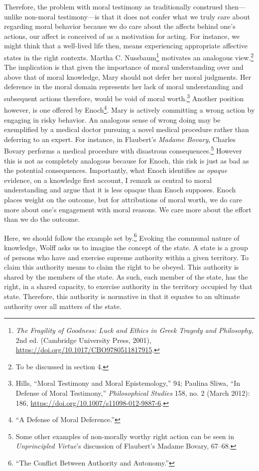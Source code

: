 \documentclass[phdthesis,12pt,final]{wuthesis}
\theoremstyle{definition}
\theoremstyle{definition}
\theoremstyle{definition}
\theoremstyle{definition}
\theoremstyle{remark}
\begin{document}
Therefore, the problem with moral testimony as traditionally construed then---unlike non-moral testimony---is that it does not confer what we truly care about regarding moral behavior because we do care about the affects behind one's actions, our affect is conceived of as a motivation for acting. For instance, we might think that a well-lived life then, means experiencing appropriate affective states in the right contexts. Martha C. Nussbaum\footnote{\emph{The {Fragility} of {Goodness}: {Luck} and {Ethics} in {Greek Tragedy} and {Philosophy}}, 2nd ed. (Cambridge University Press, 2001), \url{https://doi.org/10.1017/CBO9780511817915}.} motivates an analogous view.\footnote{To be discussed in section 4.} The implication is that given the importance of moral understanding over and above that of moral knowledge, Mary should not defer her moral judgments. Her deference in the moral domain represents her lack of moral understanding and subsequent actions therefore, would be void of moral worth.\footnote{Hills, {``Moral Testimony and Moral Epistemology,''} 94; Paulina Sliwa, {``In Defense of Moral Testimony,''} \emph{Philosophical Studies} 158, no. 2 (March 2012): 186, \url{https://doi.org/10.1007/s11098-012-9887-6}.} Another position however, is one offered by Enoch\footnote{{``A {Defense} of {Moral Deference}.''}}. Mary is actively committing a wrong action by engaging in risky behavior. An analogous sense of wrong doing may be exemplified by a medical doctor pursuing a novel medical procedure rather than deferring to an expert. For instance, in Flaubert's \emph{Madame Bovary}, Charles Bovary performs a medical procedure with disastrous consequences.\footnote{ Some other examples of non-morally worthy right action can be seen in \emph{Unprincipled {Virtue}}'s discussion of Flaubert's Madame Bovary, 67--68.} However this is not as completely analogous because for Enoch, this risk is just as bad as the potential consequences. Importantly, what Enoch identifies as \emph{opaque} evidence, on a knowledge first account, I remark as central to moral understanding and argue that it is less opaque than Enoch supposes. Enoch places weight on the outcome, but for attributions of moral worth, we do care more about one's engagement with moral reasons. We care more about the effort than we do the outcome.

Here, we should follow the example set by.\footnote{{``The {Conflict Between Authority} and {Autonomy}.''}} Evoking the communal nature of knowledge, Wolff asks us to imagine the concept of the state. A state is a group of persons who have and exercise supreme authority within a given territory. To claim this authority means to claim the right to be obeyed. This authority is shared by the members of the state. As such, each member of the state, has the right, in a shared capacity, to exercise authority in the territory occupied by that state. Therefore, this authority is normative in that it equates to an ultimate authority over all matters of the state.
\end{document}
